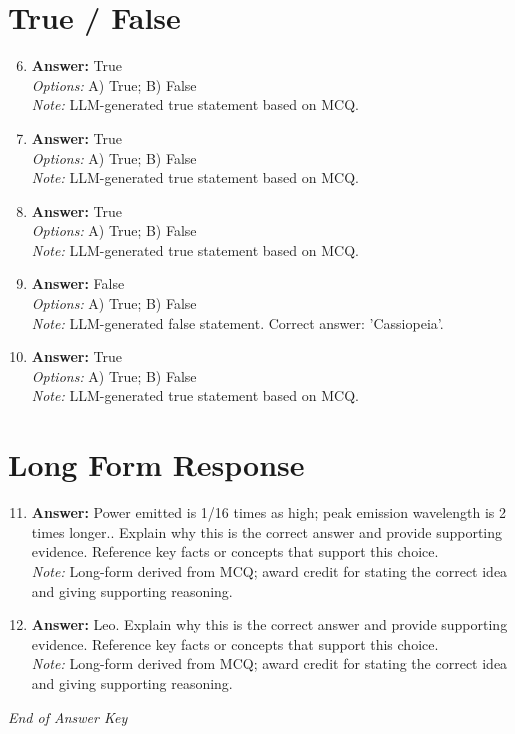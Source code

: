 \documentclass[12pt]{article}
\begin{document}
\section*{True / False}
\begin{enumerate}[label=\arabic*.]
\setcounter{enumi}{5}
\item \textbf{Answer:} True
\\ \textit{Options:} A) True; B) False
\\ \textit{Note:} LLM-generated true statement based on MCQ.
\item \textbf{Answer:} True
\\ \textit{Options:} A) True; B) False
\\ \textit{Note:} LLM-generated true statement based on MCQ.
\item \textbf{Answer:} True
\\ \textit{Options:} A) True; B) False
\\ \textit{Note:} LLM-generated true statement based on MCQ.
\item \textbf{Answer:} False
\\ \textit{Options:} A) True; B) False
\\ \textit{Note:} LLM-generated false statement. Correct answer: 'Cassiopeia'.
\item \textbf{Answer:} True
\\ \textit{Options:} A) True; B) False
\\ \textit{Note:} LLM-generated true statement based on MCQ.
\end{enumerate}

\section*{Long Form Response}
\begin{enumerate}[label=\arabic*.]
\setcounter{enumi}{10}
\item \textbf{Answer:} Power emitted is 1/16 times as high; peak emission wavelength is 2 times longer.. Explain why this is the correct answer and provide supporting evidence. Reference key facts or concepts that support this choice.
\\ \textit{Note:} Long-form derived from MCQ; award credit for stating the correct idea and giving supporting reasoning.
\item \textbf{Answer:} Leo. Explain why this is the correct answer and provide supporting evidence. Reference key facts or concepts that support this choice.
\\ \textit{Note:} Long-form derived from MCQ; award credit for stating the correct idea and giving supporting reasoning.
\end{enumerate}

\vfill
\noindent\textit{End of Answer Key}
\end{document}
